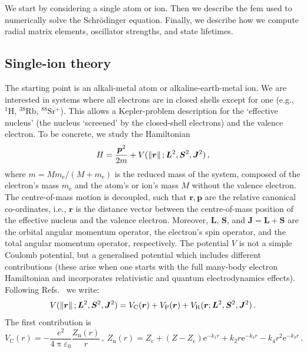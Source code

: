 \documentclass[fontsize=12pt,
               twoside=false,
               BCOR=0mm,
               DIV=14,
               overfullrule=true, %
               toc=bibliography,
               headinclude=true,
               footinclude=false]{scrartcl}
\numberwithin{equation}{section}
\newcommand{\ee}{\mathrm{e}}
\newcommand{\pii}{\uppi}
\begin{document}
    We start by considering a single atom or ion. Then we describe the \ac{fem}
    used to numerically solve the Schr\"odinger equation. Finally, we describe
    how we compute radial matrix elements, oscillator strengths, and
    state lifetimes.

    \subsection{Single-ion theory}
    \label{subsec:SingleIonTheory}

    The starting point is an alkali-metal atom or alkaline-earth-metal ion. We
    are interested in systems where all electrons are in closed shells except
    for one (e.g., $\mathrm{^1H}$, $\mathrm{^{38}Rb}$, $\mathrm{^{88}Sr^+}$).
    This allows a Kepler-problem description for the `effective nucleus' (the
    nucleus `screened' by the closed-shell electrons) and the valence electron.
    To be concrete, we study the Hamiltonian
    \begin{equation}
        H = \frac{\bm{p}^2}{2m}+V(\norm*{\bm{r}};\bm{L}^2,\bm{S}^2,\bm{J}^2)
    \,,
    \end{equation}
    where $m=Mm_\mathrm{e}\slash(M+m_\mathrm{e})$ is the reduced mass of the
    system, composed of the electron's mass $m_\mathrm{e}$ and the atom's or
    ion's mass $M$ without the valence electron. The centre-of-mass motion is
    decoupled, such that $\bm{r},\bm{p}$ are the relative canonical
    co-ordinates, i.e., $\bm{r}$ is the distance vector between the
    centre-of-mass position of the effective nucleus and the valence electron.
    Moreover, $\bm{L}$, $\bm{S}$, and $\bm{J}=\bm{L}+\bm{S}$ are the orbital
    angular momentum operator, the electron's spin operator, and the total
    angular momentum operator, respectively. The potential $V$ is not a simple
    Coulomb potential, but a generalised potential which includes different
    contributions (these arise when one starts with the full many-body electron
    Hamiltonian and incorporates relativistic and quantum electrodynamics
    effects). Following Refs.~\cite{aymar1996,marinescu1994,wilkinson2025} we
    write:
    \begin{equation}
        V(\norm*{\bm{r}};\bm{L}^2,\bm{S}^2,\bm{J}^2)
        =
        V_\mathrm{C}(\bm{r})
        +
        V_\mathrm{P}(\bm{r})
        +
        V_\mathrm{R}(\bm{r};\bm{L}^2,\bm{S}^2,\bm{J}^2)
    \,.
    \end{equation}
    The first contribution is
    \begin{equation}
        V_\mathrm{C}(r)
        =
        -\frac{e^2}{4\pii\varepsilon_0}\frac{Z_\mathrm{n}(r)}{r}
    \,, \
        Z_\mathrm{n}(r)
        =
        Z_\mathrm{c}+(Z-Z_\mathrm{c})\ee^{-k_1r}
        +
        k_2r\ee^{-k_3r}
        -
        k_4r^2\ee^{-k_3r}
    \,.
    \end{equation}
\end{document}
